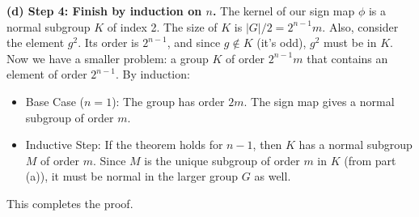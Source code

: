\begin{solution}
\textbf{(d) Step 4: Finish by induction on $n$.}
The kernel of our sign map $\phi$ is a normal subgroup $K$ of index 2.
The size of $K$ is $|G| / 2 = 2^{n-1} m$.
Also, consider the element $g^2$. Its order is $2^{n-1}$, and since $g \notin K$ (it's odd), $g^2$ must be in $K$.
Now we have a smaller problem: a group $K$ of order $2^{n-1} m$ that contains an element of order $2^{n-1}$.
By induction:
\begin{itemize}
    \item Base Case ($n=1$): The group has order $2m$. The sign map gives a normal subgroup of order $m$.
    \item Inductive Step: If the theorem holds for $n-1$, then $K$ has a normal subgroup $M$ of order $m$.
    Since $M$ is the unique subgroup of order $m$ in $K$ (from part (a)), it must be normal in the larger group $G$ as well.
\end{itemize}
This completes the proof.
\end{solution}

